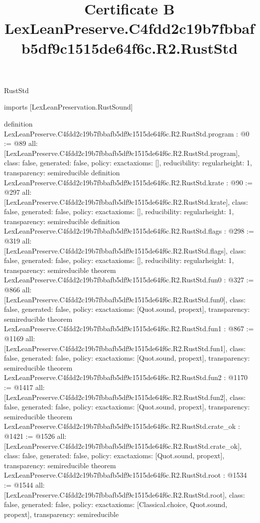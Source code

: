 \begin{lexlean}{RustStd}
\title{Certificate B LexLeanPreserve.C4fdd2c19b7fbbafb5df9c1515de64f6c.R2.RustStd}
\begin{coremodule}
imports [LexLeanPreservation.RustSound]

definition LexLeanPreserve.C4fdd2c19b7fbbafb5df9c1515de64f6c.R2.RustStd.program : @0 := @89 {
  all: [LexLeanPreserve.C4fdd2c19b7fbbafb5df9c1515de64f6c.R2.RustStd.program],
  class: false,
  generated: false,
  policy: exact{axioms: []},
  reducibility: regular{height: 1},
  transparency: semireducible
}
definition LexLeanPreserve.C4fdd2c19b7fbbafb5df9c1515de64f6c.R2.RustStd.krate : @90 := @297 {
  all: [LexLeanPreserve.C4fdd2c19b7fbbafb5df9c1515de64f6c.R2.RustStd.krate],
  class: false,
  generated: false,
  policy: exact{axioms: []},
  reducibility: regular{height: 1},
  transparency: semireducible
}
definition LexLeanPreserve.C4fdd2c19b7fbbafb5df9c1515de64f6c.R2.RustStd.flags : @298 := @319 {
  all: [LexLeanPreserve.C4fdd2c19b7fbbafb5df9c1515de64f6c.R2.RustStd.flags],
  class: false,
  generated: false,
  policy: exact{axioms: []},
  reducibility: regular{height: 1},
  transparency: semireducible
}
theorem LexLeanPreserve.C4fdd2c19b7fbbafb5df9c1515de64f6c.R2.RustStd.fun0 : @327 := @866 {
  all: [LexLeanPreserve.C4fdd2c19b7fbbafb5df9c1515de64f6c.R2.RustStd.fun0],
  class: false,
  generated: false,
  policy: exact{axioms: [Quot.sound, propext]},
  transparency: semireducible
}
theorem LexLeanPreserve.C4fdd2c19b7fbbafb5df9c1515de64f6c.R2.RustStd.fun1 : @867 := @1169 {
  all: [LexLeanPreserve.C4fdd2c19b7fbbafb5df9c1515de64f6c.R2.RustStd.fun1],
  class: false,
  generated: false,
  policy: exact{axioms: [Quot.sound, propext]},
  transparency: semireducible
}
theorem LexLeanPreserve.C4fdd2c19b7fbbafb5df9c1515de64f6c.R2.RustStd.fun2 : @1170 := @1417 {
  all: [LexLeanPreserve.C4fdd2c19b7fbbafb5df9c1515de64f6c.R2.RustStd.fun2],
  class: false,
  generated: false,
  policy: exact{axioms: [Quot.sound, propext]},
  transparency: semireducible
}
theorem LexLeanPreserve.C4fdd2c19b7fbbafb5df9c1515de64f6c.R2.RustStd.crate_ok : @1421 := @1526 {
  all: [LexLeanPreserve.C4fdd2c19b7fbbafb5df9c1515de64f6c.R2.RustStd.crate_ok],
  class: false,
  generated: false,
  policy: exact{axioms: [Quot.sound, propext]},
  transparency: semireducible
}
theorem LexLeanPreserve.C4fdd2c19b7fbbafb5df9c1515de64f6c.R2.RustStd.root : @1534 := @1544 {
  all: [LexLeanPreserve.C4fdd2c19b7fbbafb5df9c1515de64f6c.R2.RustStd.root],
  class: false,
  generated: false,
  policy: exact{axioms: [Classical.choice, Quot.sound, propext]},
  transparency: semireducible
}


\end{coremodule}
\end{lexlean}
